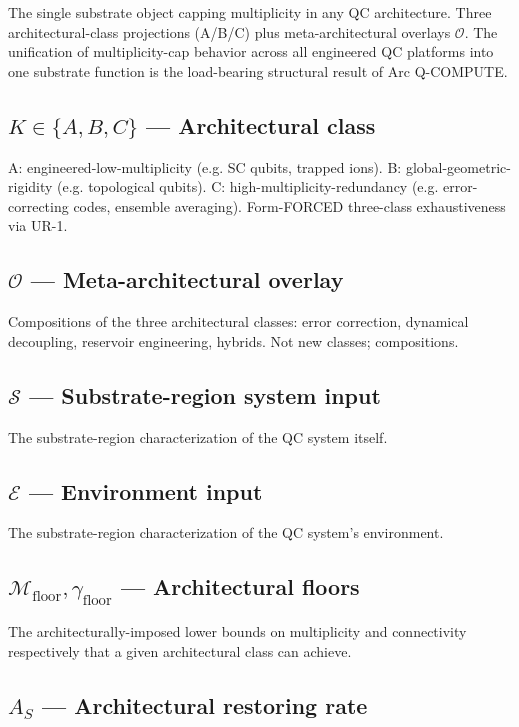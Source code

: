 \documentclass[11pt]{book}
\begin{document}
The single substrate object capping multiplicity in any QC architecture. Three architectural-class projections (A/B/C) plus meta-architectural overlays $\mathcal{O}$. The unification of multiplicity-cap behavior across all engineered QC platforms into one substrate function is the load-bearing structural result of Arc Q-COMPUTE.

\subsection{$K \in \{A, B, C\}$ — Architectural class}

A: engineered-low-multiplicity (e.g. SC qubits, trapped ions). B: global-geometric-rigidity (e.g. topological qubits). C: high-multiplicity-redundancy (e.g. error-correcting codes, ensemble averaging). Form-FORCED three-class exhaustiveness via UR-1.

\subsection{$\mathcal{O}$ — Meta-architectural overlay}

Compositions of the three architectural classes: error correction, dynamical decoupling, reservoir engineering, hybrids. Not new classes; compositions.

\subsection{$\mathcal{S}$ — Substrate-region system input}

The substrate-region characterization of the QC system itself.

\subsection{$\mathcal{E}$ — Environment input}

The substrate-region characterization of the QC system's environment.

\subsection{$\mathcal{M}_\mathrm{floor}, \gamma_\mathrm{floor}$ — Architectural floors}

The architecturally-imposed lower bounds on multiplicity and connectivity respectively that a given architectural class can achieve.

\subsection{$A_S$ — Architectural restoring rate}
\end{document}
